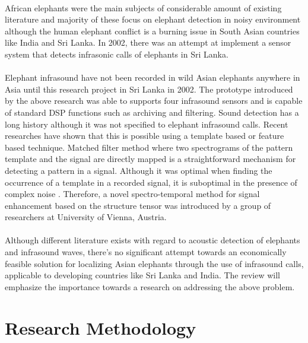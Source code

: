 \documentclass[11pt]{article}
\numberwithin{figure}{section}
\numberwithin{table}{section}
\begin{document}
\paragraph{}
African elephants were the main subjects of considerable amount of existing literature and majority of these focus on elephant detection in noisy environment although the human elephant conflict is a burning issue in South Asian countries like India and Sri Lanka. In 2002, there was an attempt at implement a sensor system that detects infrasonic calls of elephants in Sri Lanka.

\paragraph{}
Elephant infrasound have not been recorded in wild Asian elephants anywhere in Asia until this research project in Sri Lanka in 2002. The prototype introduced by the above research was able to supports four infrasound sensors and is capable of standard DSP functions such as archiving and filtering. Sound detection has a long history although it was not specified to elephant infrasound calls. Recent researches have shown that this is possible using a template based or feature based technique. Matched filter method where two spectrograms of the pattern template and the signal are directly mapped is a straightforward mechanism for detecting a pattern in a signal. Although it was optimal when finding the occurrence of a template in a recorded signal, it is suboptimal in the presence of complex noise \cite {10}. Therefore, a novel spectro-temporal method for signal enhancement based on the structure tensor \cite {11} was introduced by a group of researchers at University of Vienna, Austria. 

\paragraph{}
Although different literature exists with regard to acoustic detection of elephants and infrasound waves, there’s no significant attempt towards an economically feasible solution for localizing Asian elephants through the use of infrasound calls, applicable to developing countries like Sri Lanka and India. The review will emphasize the importance towards a research on addressing the above problem.

\section{Research Methodology }
\end{document}
